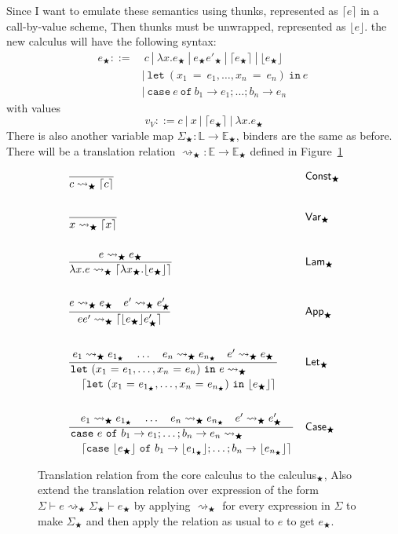 \documentclass[float=false, crop=false]{standalone}
\numberwithin{subcase}{case}
\newcommand{\tlang}{\bigstar}
\newcommand{\thunk}[1]{\lceil #1 \rceil}
\newcommand{\unwrap}[1]{\lfloor #1 \rfloor}
\newcommand{\tlthunk}{\rightsquigarrow_\tlang}
\begin{document}
Since I want to emulate these semantics using thunks, represented as $\thunk{e}$ in a call-by-value scheme, 
Then thunks must be unwrapped, represented as $\unwrap{e}$. 
the new calculus will have the following syntax:
\begin{align*} 
  e_\tlang ::=&\ c\ |\ \lambda x.e_\tlang\ |\ e_\tlang e'_\tlang\ |\ \thunk{e_\tlang}\ |\ \unwrap{e_\tlang}
  \\ &|\ \mathtt{let}\ (x_1\ \mathtt{=}\ e_1,\dotsc, x_n\ \mathtt{=}\ e_n)\ \mathtt{in}\ e\
  \\ &|\ \mathtt{case}\ e\ \mathtt{of}\ b_1 \rightarrow e_1; \dots; b_n \rightarrow e_n
\end{align*}
with values 
\[ v_V ::= c\ |\ x\ |\ \thunk{e_\tlang}\ |\ \lambda x. e_\tlang \]
There is also another variable map $\Sigma_\tlang : \mathbb{L} \rightarrow \mathbb{E}_\tlang$, 
binders are the same as before.
There will be a translation relation $\tlthunk: \mathbb{E} \rightarrow \mathbb{E}_\tlang$
defined in Figure~\ref{t:translation}

\begin{figure}
\begin{align*}
  &\frac{}{c \tlthunk \thunk{c}} && \mathsf{Const}_\tlang\\ \\
  &\frac{}{x \tlthunk \thunk{x}} && \mathsf{Var}_\tlang\\ \\
  &\frac{e \tlthunk e_\tlang}
     {\lambda x . e \tlthunk \thunk{\lambda x_\tlang.\unwrap{e_\tlang}}}
       && \mathsf{Lam}_\tlang\\ \\
  &\frac{e  \tlthunk e_\tlang \quad e' \tlthunk e'_\tlang}
  {e e' \tlthunk \thunk{\unwrap{e_\tlang} e'_\tlang}} && \mathsf{App}_\tlang\\\\
  &\dfrac{e_1  \tlthunk e_{1_\tlang} \quad \dots \quad e_n \tlthunk e_{n_\tlang} \quad e' \tlthunk e_\tlang}
  {\splitdfrac{\mathtt{let}\ (x_1\ \mathtt{=}\ e_1,\dotsc, x_n\ \mathtt{=}\ e_n)\ \mathtt{in}\ e \tlthunk}
    {\thunk{\mathtt{let}\ 
        (x_1\ \mathtt{=}\ e_{1_\tlang},\dotsc, x_n\ \mathtt{=}\ e_{n_\tlang}) \ \mathtt{in}\ \unwrap{e_\tlang}}}} && \mathsf{Let}_\tlang\\ \\
  &\dfrac{e_1  \tlthunk e_{1_\tlang} \quad \dots \quad e_n \tlthunk e_{n_\tlang} \quad e' \tlthunk e'_\tlang}
  {\splitdfrac{\mathtt{case}\ e\ \mathtt{of}\ b_1 \rightarrow e_1; \dots; b_n \rightarrow e_n \tlthunk}
  {\thunk{\mathtt{case}\ \unwrap{e_\tlang}\ \mathtt{of}\ b_1 \rightarrow \unwrap{e_{1_\tlang}}; 
      \dots; b_n \rightarrow \unwrap{e_{n_\tlang}}}}} && \mathsf{Case}_\tlang
\end{align*}
\caption[Definition of translation relation from the core calculus to  calculus$_\tlang$]{Translation relation from the core calculus to the calculus$_\tlang$, Also
extend the translation relation over expression of the form $\Sigma \vdash e \tlthunk \Sigma_\tlang 
\vdash e_\tlang$ by applying $\tlthunk$ for every expression in $\Sigma$ to make $\Sigma_\tlang$ and
then apply the relation as usual to $e$ to get $e_\tlang$.}
\label{t:translation}
\end{figure}
\end{document}
